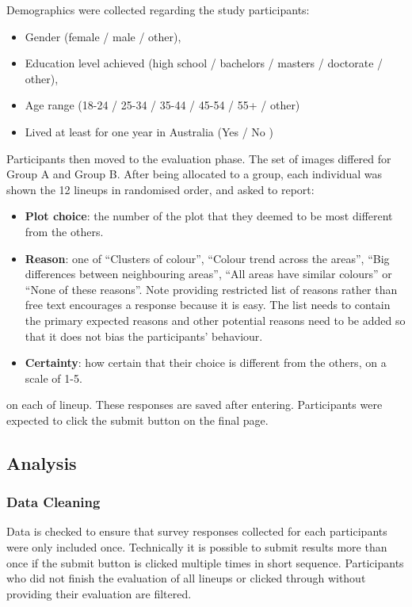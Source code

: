 \documentclass[
doublespace,
  times]{anzsauth}
\providecommand{\tightlist}{%
  \setlength{\itemsep}{0pt}\setlength{\parskip}{0pt}}
\begin{document}
Demographics were collected regarding the study participants:

\begin{itemize}
\tightlist
\item
  Gender (female / male / other),
\item
  Education level achieved (high school / bachelors / masters /
  doctorate / other),
\item
  Age range (18-24 / 25-34 / 35-44 / 45-54 / 55+ / other)
\item
  Lived at least for one year in Australia (Yes / No )
\end{itemize}

Participants then moved to the evaluation phase. The set of images
differed for Group A and Group B. After being allocated to a group, each
individual was shown the 12 lineups in randomised order, and asked to
report:

\begin{itemize}
\tightlist
\item
  \textbf{Plot choice}: the number of the plot that they deemed to be
  most different from the others.
\item
  \textbf{Reason}: one of ``Clusters of colour'', ``Colour trend across
  the areas'', ``Big differences between neighbouring areas'', ``All
  areas have similar colours'' or ``None of these reasons''. Note
  providing restricted list of reasons rather than free text encourages
  a response because it is easy. The list needs to contain the primary
  expected reasons and other potential reasons need to be added so that
  it does not bias the participants' behaviour.
\item
  \textbf{Certainty}: how certain that their choice is different from
  the others, on a scale of 1-5.
\end{itemize}

on each of lineup. These responses are saved after entering.
Participants were expected to click the submit button on the final page.

\subsection{Analysis}\label{analysis}

\subsubsection{Data Cleaning}\label{data-cleaning}

Data is checked to ensure that survey responses collected for each
participants were only included once. Technically it is possible to
submit results more than once if the submit button is clicked multiple
times in short sequence. Participants who did not finish the evaluation
of all lineups or clicked through without providing their evaluation are
filtered.
\end{document}
